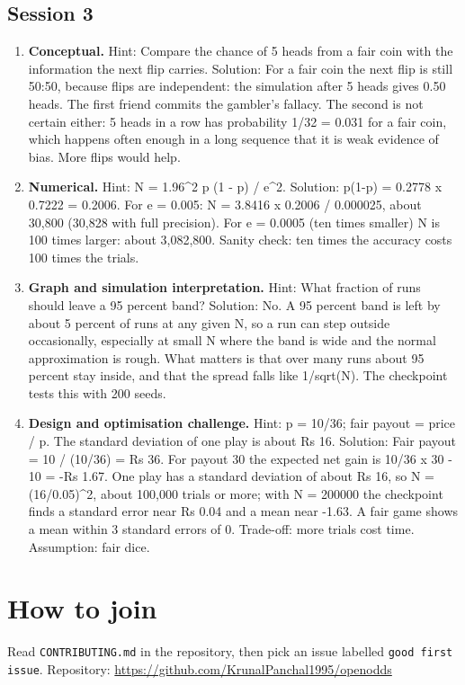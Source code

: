 \documentclass[11pt,a4paper]{article}
\begin{document}
\subsection*{Session 3}
\begin{enumerate}[nosep]
\item \textbf{Conceptual.} Hint: Compare the chance of 5 heads from a fair coin with the information the next flip carries. Solution: For a fair coin the next flip is still 50:50, because flips are independent: the simulation after 5 heads gives 0.50 heads. The first friend commits the gambler's fallacy. The second is not certain either: 5 heads in a row has probability 1/32 = 0.031 for a fair coin, which happens often enough in a long sequence that it is weak evidence of bias. More flips would help.
\item \textbf{Numerical.} Hint: N = 1.96\textasciicircum{}2 p (1 - p) / e\textasciicircum{}2. Solution: p(1-p) = 0.2778 x 0.7222 = 0.2006. For e = 0.005: N = 3.8416 x 0.2006 / 0.000025, about 30,800 (30,828 with full precision). For e = 0.0005 (ten times smaller) N is 100 times larger: about 3,082,800. Sanity check: ten times the accuracy costs 100 times the trials.
\item \textbf{Graph and simulation interpretation.} Hint: What fraction of runs should leave a 95 percent band? Solution: No. A 95 percent band is left by about 5 percent of runs at any given N, so a run can step outside occasionally, especially at small N where the band is wide and the normal approximation is rough. What matters is that over many runs about 95 percent stay inside, and that the spread falls like 1/sqrt(N). The checkpoint tests this with 200 seeds.
\item \textbf{Design and optimisation challenge.} Hint: p = 10/36; fair payout = price / p. The standard deviation of one play is about Rs 16. Solution: Fair payout = 10 / (10/36) = Rs 36. For payout 30 the expected net gain is 10/36 x 30 - 10 = -Rs 1.67. One play has a standard deviation of about Rs 16, so N = (16/0.05)\textasciicircum{}2, about 100,000 trials or more; with N = 200000 the checkpoint finds a standard error near Rs 0.04 and a mean near -1.63. A fair game shows a mean within 3 standard errors of 0. Trade-off: more trials cost time. Assumption: fair dice.
\end{enumerate}

\section{How to join}
Read \texttt{CONTRIBUTING.md} in the repository, then pick an issue labelled \texttt{good first issue}. Repository: \url{https://github.com/KrunalPanchal1995/openodds}
\end{document}
